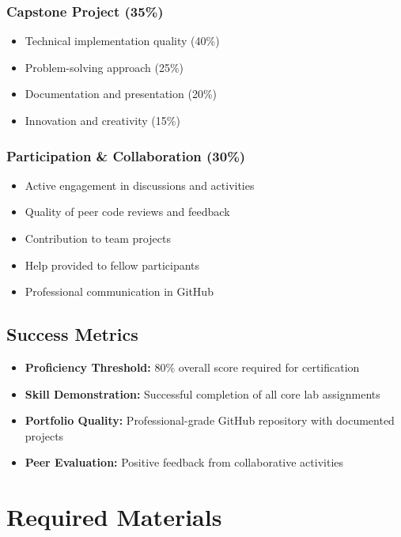 \documentclass[11pt,a4paper]{article}
\begin{document}
\subsubsection{Capstone Project (35\%)}
\begin{itemize}
    \item Technical implementation quality (40\%)
    \item Problem-solving approach (25\%)
    \item Documentation and presentation (20\%)
    \item Innovation and creativity (15\%)
\end{itemize}

\subsubsection{Participation \& Collaboration (30\%)}
\begin{itemize}
    \item Active engagement in discussions and activities
    \item Quality of peer code reviews and feedback
    \item Contribution to team projects
    \item Help provided to fellow participants
    \item Professional communication in GitHub
\end{itemize}

\subsection{Success Metrics}
\begin{itemize}
    \item \textbf{Proficiency Threshold:} 80\% overall score required for certification
    \item \textbf{Skill Demonstration:} Successful completion of all core lab assignments
    \item \textbf{Portfolio Quality:} Professional-grade GitHub repository with documented projects
    \item \textbf{Peer Evaluation:} Positive feedback from collaborative activities
\end{itemize}

\section{Required Materials}
\end{document}
